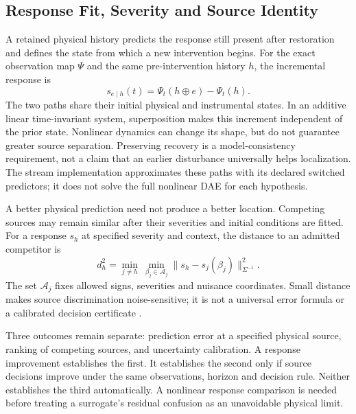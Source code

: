 \subsection{Response Fit, Severity and Source Identity}
\label{sec:response-fit-information}

A retained physical history predicts the response still present after
restoration and defines the state from which a new intervention begins.
For the exact observation map $\Psi$ and the same pre-intervention history
$h$, the incremental response is
\begin{equation}
 s_{e\mid h}(t)=\Psi_t(h\oplus e)-\Psi_t(h).
 \label{eq:history-increment}
\end{equation}
The two paths share their initial physical and instrumental states.
In an additive linear time-invariant system, superposition makes this
increment independent of the prior state. Nonlinear dynamics can change
its shape, but do not guarantee greater source separation. Preserving
recovery is a model-consistency requirement, not a claim that an earlier
disturbance universally helps localization. The stream implementation
approximates these paths with its declared switched predictors; it does
not solve the full nonlinear DAE for each hypothesis.

A better physical prediction need not produce a better location. Competing
sources may remain similar after their severities and initial conditions
are fitted. For a response $s_h$ at specified severity and context, the
distance to an admitted competitor is
\begin{equation}
 d_h^2=\min_{j\ne h}\ \min_{\beta_j\in\mathcal A_j}
       \|s_h-s_j(\beta_j)\|_{\Sigma^{-1}}^2.
 \label{eq:conditional-source-separation}
\end{equation}
The set $\mathcal A_j$ fixes allowed signs, severities and nuisance
coordinates. Small distance makes source discrimination noise-sensitive;
it is not a universal error formula or a calibrated decision certificate
\cite{eriksson2013diagnosability,scharf1994matched}.

Three outcomes remain separate: prediction error at a specified physical
source, ranking of competing sources, and uncertainty calibration. A
response improvement establishes the first. It establishes the second only
if source decisions improve under the same observations, horizon and
decision rule. Neither establishes the third automatically. A nonlinear
response comparison is needed before treating a surrogate's residual
confusion as an unavoidable physical limit.

